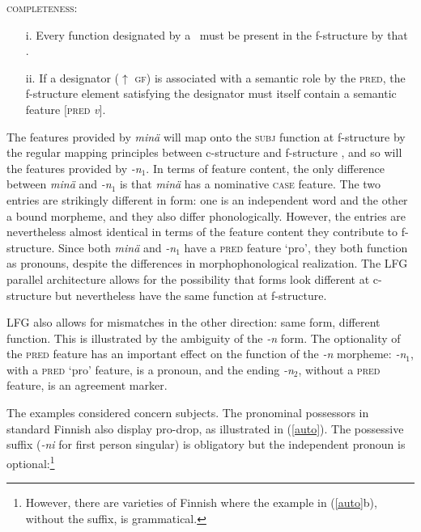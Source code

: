 \documentclass[output=paper,hidelinks]{langscibook}
\begin{document}
  \ea \label{completeness} \textsc{completeness:}  
  \begin{itemize}
  \item[i.  ]   Every  function designated by a \PRED\  must be  present  in the f-structure by  that \PRED.
  \item[ii. ] If a designator ($\uparrow$ \textsc{gf}) is associated with a semantic role by the \textsc{pred}, the f-structure element satisfying the designator must itself contain a semantic feature $[$\textsc{pred} \textit{v}$]$.
  \end{itemize}
\z
 The features provided by  \textit{min\"{a}} will map onto the \textsc{subj} function at f-structure by the regular mapping principles between c-structure and f-structure \citep[Chapter  4]{BresnanEtAl2016}, and so will the features provided by  \textit{-n}$_1$.  In  terms of feature   content, the only difference between   \textit{min\"{a}} and  \textit{-n}$_1$ is that  \textit{min\"{a}}   has a nominative \textsc{case} feature.   The  two entries are strikingly different in form: one is  an independent word and  the  other a bound morpheme, and they also differ  phonologically. However, the  entries  are  nevertheless almost identical in terms of  the feature  content  they contribute   to  f-structure.   Since both    \textit{min\"{a}} and  \textit{-n}$_1$ have a \textsc{pred} feature `pro', they    both function as pronouns, despite the  differences in morphophonological realization.      The LFG  parallel architecture allows for  the possibility  that forms look different at c-structure but nevertheless  have the same function   at f-structure. 
 
 
 LFG also allows for mismatches in the other direction: same form, different function. This is illustrated by the ambiguity  of the \textit{-n} form.  The  optionality of the \textsc{pred} feature has an important effect on the function of  the   \textit{-n} morpheme:     \textit{-n}$_1$, with a \textsc{pred} `pro'  feature, is a  pronoun,  and the ending \textit{-n}$_2$, without a \textsc{pred}  feature, is an agreement marker. 




The examples considered  concern subjects.  The  pronominal possessors  in standard  Finnish also display  pro-drop, as  illustrated  in  (\ref{auto}). The possessive suffix (\textit{-ni} for first person singular) is obligatory but the independent pronoun is optional:\footnote{However, there are varieties of Finnish where  the  example  in  (\ref{auto}b),  without the  suffix,  is  grammatical. }
\end{document}
